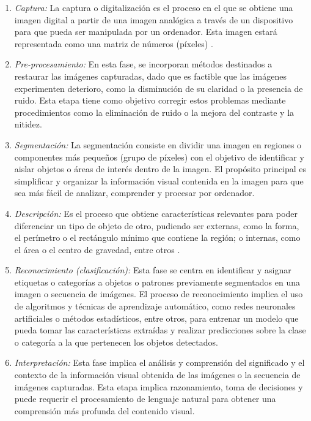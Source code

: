\begin{enumerate}
 \item \textit{Captura:} La captura o digitalización es el proceso en el que se obtiene una imagen digital a partir de una imagen analógica a través de un dispositivo para que pueda ser manipulada por un ordenador. Esta imagen estará representada como una matriz de números (píxeles) \cite{Martinez22}.
 
 \item \textit{Pre-procesamiento:} En esta fase, se incorporan métodos destinados a restaurar las imágenes capturadas, dado que es factible que las imágenes experimenten deterioro, como la disminución de su claridad o la presencia de ruido. Esta etapa tiene como objetivo corregir estos problemas mediante procedimientos como la eliminación de ruido o la mejora del contraste y la nitidez.
 
 \item \textit{Segmentación:} La segmentación consiste en dividir una imagen en regiones o componentes más pequeños (grupo de píxeles) con el objetivo de identificar y aislar objetos o áreas de interés dentro de la imagen. El propósito principal es simplificar y organizar la información visual contenida en la imagen para que sea más fácil de analizar, comprender y procesar por ordenador.

 \item \textit{Descripción:} Es el proceso que obtiene características relevantes para poder diferenciar un tipo de objeto de otro, pudiendo ser externas, como la forma, el perímetro o el rectángulo mínimo que contiene la región; o internas, como el área o el centro de gravedad, entre otros \cite{Santillan15}. 
 
 \item \textit{Reconocimiento (clasificación):} Esta fase se centra en identificar y asignar etiquetas o categorías a objetos o patrones previamente segmentados en una imagen o secuencia de imágenes. El proceso de reconocimiento implica el uso de algoritmos y técnicas de aprendizaje automático, como redes neuronales artificiales o métodos estadísticos, entre otros, para entrenar un modelo que pueda tomar las características extraídas y realizar predicciones sobre la clase o categoría a la que pertenecen los objetos detectados.
 
 \item \textit{Interpretación:} Esta fase implica el análisis y comprensión del significado y el contexto de la información visual obtenida de las imágenes o la secuencia de imágenes capturadas. Esta etapa implica razonamiento, toma de decisiones y puede requerir el procesamiento de lenguaje natural para obtener una comprensión más profunda del contenido visual.
 
\end{enumerate}

